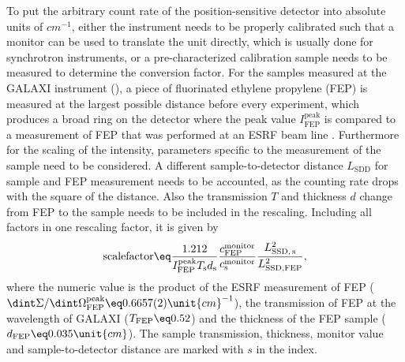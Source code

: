 \documentclass[\main/dresen_thesis.tex]{subfiles}
\begin{document}
    To put the arbitrary count rate of the position-sensitive detector into absolute units of $\unit{cm^{-1}}$, either the instrument needs to be properly calibrated such that a monitor can be used to translate the unit directly, which is usually done for synchrotron instruments, or a pre-characterized calibration sample needs to be measured to determine the conversion factor.
    For the samples measured at the GALAXI instrument (), a piece of fluorinated ethylene propylene (FEP) is measured at the largest possible distance before every experiment, which produces a broad ring on the detector where the peak value $I_\mathrm{FEP}^\mathrm{peak}$ is compared to a measurement of FEP that was performed at an ESRF beam line \cite{Meyer_2009_Struk}.
    Furthermore for the scaling of the intensity, parameters specific to the measurement of the sample need to be considered.
    A different sample-to-detector distance $L_\mathrm{SDD}$ for sample and FEP measurement needs to be accounted, as the counting rate drops with the square of the distance.
    Also the transmission $T$ and thickness $d$ change from FEP to the sample needs to be included in the rescaling.
    Including all factors in one rescaling factor, it is given by
    \begin{align}
      \mathrm{scale factor} \eq \frac{1.212}{I_\mathrm{FEP}^\mathrm{peak} T_\mathrm{s} d_\mathrm{s}} \frac{c^\mathrm{monitor}_\mathrm{FEP}}{c_\mathrm{s}^\mathrm{monitor}} \frac{L^2_\mathrm{SSD,\, s}}{L^2_\mathrm{SSD, FEP}},
    \end{align}
    where the numeric value is the product of the ESRF measurement of FEP ($\dint \Sigma / \dint \Omega_\mathrm{FEP}^\mathrm{peak} \eq 0.6657(2) \unit{cm}^{-1}$), the transmission of FEP at the wavelength of GALAXI ($T_\mathrm{FEP} \eq 0.52$) and the thickness of the FEP sample ($d_\mathrm{FEP} \eq 0.035 \unit{cm}$).
    The sample transmission, thickness, monitor value and sample-to-detector distance are marked with $s$ in the index.
\end{document}
